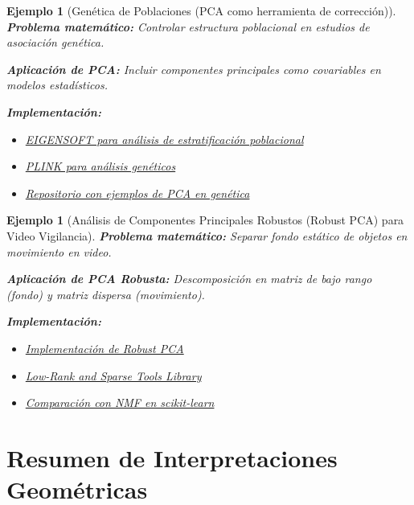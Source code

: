 \documentclass[11pt]{article}
\theoremstyle{plain}
\newtheorem{example}[theorem]{Ejemplo}
\begin{document}
\begin{example}[Genética de Poblaciones (PCA como herramienta de corrección)]
\label{ej:genetica}
\textbf{Problema matemático:} Controlar estructura poblacional en estudios de asociación genética.

\textbf{Aplicación de PCA:} Incluir componentes principales como covariables en modelos estadísticos.

\textbf{Implementación:}
\begin{itemize}
    \item \href{https://github.com/chrchang/eigensoft}{EIGENSOFT para análisis de estratificación poblacional}
    \item \href{https://www.cog-genomics.org/plink/}{PLINK para análisis genéticos}
    \item \href{https://github.com/Shicheng-Guo/PCA}{Repositorio con ejemplos de PCA en genética}
\end{itemize}
\end{example}

\begin{example}[Análisis de Componentes Principales Robustos (Robust PCA) para Video Vigilancia]
\label{ej:rpca}
\textbf{Problema matemático:} Separar fondo estático de objetos en movimiento en video.

\textbf{Aplicación de PCA Robusta:} Descomposición en matriz de bajo rango (fondo) y matriz dispersa (movimiento).

\textbf{Implementación:}
\begin{itemize}
    \item \href{https://github.com/dganguli/robust-pca}{Implementación de Robust PCA}
    \item \href{https://github.com/andrewssobral/lrslibrary}{Low-Rank and Sparse Tools Library}
    \item \href{https://scikit-learn.org/stable/auto_examples/applications/plot_topics_extraction_with_nmf_lda.html}{Comparación con NMF en scikit-learn}
\end{itemize}
\end{example}

\section{Resumen de Interpretaciones Geométricas}
\end{document}
